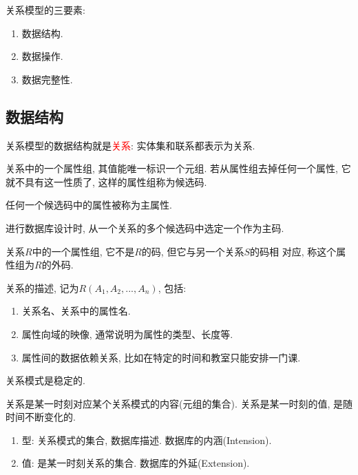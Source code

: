 关系模型的三要素:
\begin{enumerate}
    \item 数据结构.
    \item 数据操作.
    \item 数据完整性.
\end{enumerate}

\subsection{数据结构}

关系模型的数据结构就是\textcolor{red}{关系}: 实体集和联系都表示为关系.

\begin{definition}
关系中的一个属性组, 其值能唯一标识一个元组. 
若从属性组去掉任何一个属性, 它就不具有这一性质了, 这样的属性组称为候选码.
\end{definition}

\begin{definition}[主属性]
任何一个候选码中的属性被称为主属性.
\end{definition}

\begin{definition}
进行数据库设计时, 从一个关系的多个候选码中选定一个作为主码.
\end{definition}

\begin{definition}
关系$R$中的一个属性组, 它不是$R$的码, 但它与另一个关系$S$的码相
对应, 称这个属性组为$R$的外码.
\end{definition}

\begin{definition}[关系模式]
关系的描述, 记为$R(A_1,A_2,...,A_n)$, 包括:
\begin{enumerate}
    \item 关系名、关系中的属性名.
    \item 属性向域的映像, 通常说明为属性的类型、长度等.
    \item 属性间的数据依赖关系, 比如在特定的时间和教室只能安排一门课.
\end{enumerate}
关系模式是稳定的.
\end{definition}

\begin{definition}[关系]
关系是某一时刻对应某个关系模式的内容(元组的集合). 关系是某一时刻的值, 是随时间不断变化的.
\end{definition}

\begin{definition}[关系型数据库]
\begin{enumerate}
    \item 型: 关系模式的集合, 数据库描述. 数据库的内涵(Intension).
    \item 值: 是某一时刻关系的集合. 数据库的外延(Extension).
\end{enumerate}
\end{definition}

